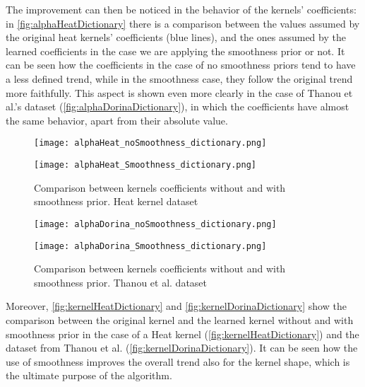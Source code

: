 The improvement can then be noticed in the behavior of the kernels' coefficients: in \autoref{fig:alphaHeatDictionary} there is a comparison between the values assumed by the original heat kernels' coefficients (blue lines), and the ones assumed by the learned coefficients in the case we are applying the smoothness prior or not. It can be seen how the coefficients in the case of no smoothness priors tend to have a less defined trend, while in the smoothness case, they follow the original trend more faithfully. This aspect is shown even more clearly in the case of Thanou et al.'s dataset (\autoref{fig:alphaDorinaDictionary}), in which the coefficients have almost the same behavior, apart from their absolute value.

\begin{figure}
  \centering
  \begin{minipage}[c]{.8\textwidth}
    \centering
    \texttt{[image: alphaHeat\_noSmoothness\_dictionary.png]}
  \end{minipage}
  \begin{minipage}[c]{.8\textwidth}
    \centering
    \texttt{[image: alphaHeat\_Smoothness\_dictionary.png]}
  \end{minipage}
  \caption{Comparison between kernels coefficients without and with smoothness prior. Heat kernel   dataset}
  \label{fig:alphaHeatDictionary}
\end{figure}

\begin{figure}
  \centering
  \begin{minipage}[c]{.8\textwidth}
    \centering
    \texttt{[image: alphaDorina\_noSmoothness\_dictionary.png]}
  \end{minipage}
  \begin{minipage}[c]{.8\textwidth}
    \centering
    \texttt{[image: alphaDorina\_Smoothness\_dictionary.png]}
  \end{minipage}
  \caption{Comparison between kernels coefficients without and with smoothness prior. Thanou et al.   dataset}
  \label{fig:alphaDorinaDictionary}
\end{figure}


Moreover, \autoref{fig:kernelHeatDictionary} and \autoref{fig:kernelDorinaDictionary} show the comparison between the original kernel and the learned kernel without and with smoothness prior in the case of a Heat kernel (\ref{fig:kernelHeatDictionary}) and the dataset from  Thanou et al. (\ref{fig:kernelDorinaDictionary}). It can be seen how the use of smoothness improves the overall trend also for the kernel shape, which is the ultimate purpose of the algorithm.

